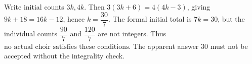 Write initial counts $3k,4k$. Then $3(3k+6)=4(4k-3)$, giving $9k+18=16k-12$, hence $k=\dfrac{30}{7}$. The formal initial total is $7k=30$, but the individual counts $\dfrac{90}{7}$ and $\dfrac{120}{7}$ are not integers. Thus $\boxed{\text{no actual choir satisfies these conditions}}$. The apparent answer $30$ must not be accepted without the integrality check.
